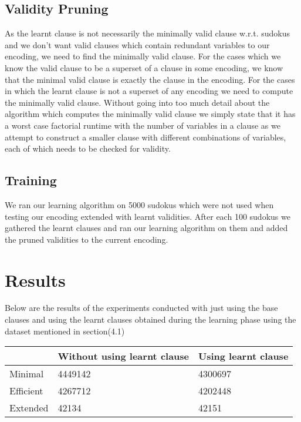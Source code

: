 \documentclass{article}
\begin{document}
\subsection{Validity Pruning} \label{val pruning}
As the learnt clause is not necessarily the minimally valid clause w.r.t. sudokus and we don't want valid clauses which contain redundant variables to our encoding, we need to find the minimally valid clause. For the cases which we know the valid clause to be a superset of a clause in some encoding, we know that the minimal valid clause is exactly the clause in the encoding. For the cases in which the learnt clause is not a superset of any encoding we need to compute the minimally valid clause. Without going into too much detail about the algorithm which computes the minimally valid clause we simply state that it has a worst case factorial runtime with the number of variables in a clause as we attempt to construct a smaller clause with different combinations of variables, each of which needs to be checked for validity.
\subsection{Training} \label{training}
We ran our learning algorithm on 5000 sudokus which were not used when testing our encoding extended with learnt validities. After each 100 sudokus we gathered the learnt clauses and ran our learning algorithm on them and added the pruned validities to the current encoding.

\section{Results} \label{results}

Below are the results of the experiments conducted with just using the base clauses and using the learnt clauses obtained during the learning phase using the dataset mentioned in section(4.1)

\begin{center}
 \label{tab:title} 
\begin{tabular}{ | l | l | l |}
    \hline
     & Without using learnt clause & Using learnt clause \\ \hline
    Minimal & 4449142 & 4300697 \\ \hline
    Efficient & 4267712 & 4202448 \\ \hline
    Extended & 42134 & 42151 \\
    \hline
\end{tabular} 
\end{center}
\end{document}
